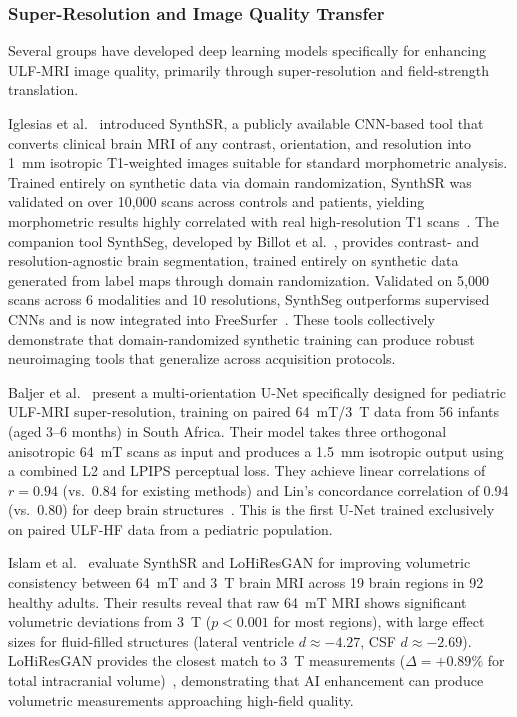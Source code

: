 \subsubsection{Super-Resolution and Image Quality Transfer}

Several groups have developed deep learning models specifically for enhancing ULF-MRI image quality, primarily through super-resolution and field-strength translation.

Iglesias et al.~\cite{iglesias2023synthsr} introduced SynthSR, a publicly available CNN-based tool that converts clinical brain MRI of any contrast, orientation, and resolution into 1~mm isotropic T1-weighted images suitable for standard morphometric analysis. Trained entirely on synthetic data via domain randomization, SynthSR was validated on over 10,000 scans across controls and patients, yielding morphometric results highly correlated with real high-resolution T1 scans~\cite{iglesias2023synthsr}. The companion tool SynthSeg, developed by Billot et al.~\cite{billot2023synthseg}, provides contrast- and resolution-agnostic brain segmentation, trained entirely on synthetic data generated from label maps through domain randomization. Validated on 5,000 scans across 6 modalities and 10 resolutions, SynthSeg outperforms supervised CNNs and is now integrated into FreeSurfer~\cite{billot2023synthseg}. These tools collectively demonstrate that domain-randomized synthetic training can produce robust neuroimaging tools that generalize across acquisition protocols.

Baljer et al.~\cite{baljer2025pediatricsr} present a multi-orientation U-Net specifically designed for pediatric ULF-MRI super-resolution, training on paired 64~mT/3~T data from 56 infants (aged 3--6 months) in South Africa. Their model takes three orthogonal anisotropic 64~mT scans as input and produces a 1.5~mm isotropic output using a combined L2 and LPIPS perceptual loss. They achieve linear correlations of $r = 0.94$ (vs.\ 0.84 for existing methods) and Lin's concordance correlation of 0.94 (vs.\ 0.80) for deep brain structures~\cite{baljer2025pediatricsr}. This is the first U-Net trained exclusively on paired ULF-HF data from a pediatric population.

Islam et al.~\cite{islam2025volumetric} evaluate SynthSR and LoHiResGAN for improving volumetric consistency between 64~mT and 3~T brain MRI across 19 brain regions in 92 healthy adults. Their results reveal that raw 64~mT MRI shows significant volumetric deviations from 3~T ($p < 0.001$ for most regions), with large effect sizes for fluid-filled structures (lateral ventricle $d \approx -4.27$, CSF $d \approx -2.69$). LoHiResGAN provides the closest match to 3~T measurements ($\Delta = +0.89\%$ for total intracranial volume)~\cite{islam2025volumetric}, demonstrating that AI enhancement can produce volumetric measurements approaching high-field quality.

